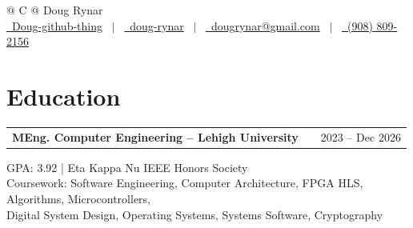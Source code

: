 \documentclass[letter,12pt]{article}
\makeatletter
\newenvironment{jobshort}[2]
    {
    \begin{tabularx}{\linewidth}{@{}l X r@{}}
    \textbf{#1} & \hfill &  #2 \\[3.75pt]
    \end{tabularx}
    }
    {
    }
\makeatother
\begin{document}
\pagestyle{empty} 



\begin{tabularx}{\linewidth}{@{} C @{}}
\Huge{Doug Rynar} \\[7.5pt]
\href{https://github.com/Doug-github-thing}{\raisebox{-0.05\height}\faGithub\ Doug-github-thing} \ $|$ \ 
\href{https://linkedin.com/in/doug-rynar}{\raisebox{-0.05\height}\faLinkedin\ doug-rynar} \ $|$ \ 
\href{mailto:dougrynar@gmail.com}{\raisebox{-0.05\height}\faEnvelope \ dougrynar@gmail.com} \ $|$ \ 
\href{tel:+1 (908) 809-2156}{\raisebox{-0.05\height}\faMobile \ (908) 809-2156} \\
\end{tabularx}



\section{Education}

\begin{jobshort}{MEng. Computer Engineering -- Lehigh University}{2023 -- Dec 2026}
    GPA: 3.92 | Eta Kappa Nu IEEE Honors Society\\
    \small Coursework: Software Engineering, Computer Architecture, FPGA HLS, Algorithms, Microcontrollers, \\Digital System Design, Operating Systems, Systems Software, Cryptography
\end{jobshort}
\end{document}
